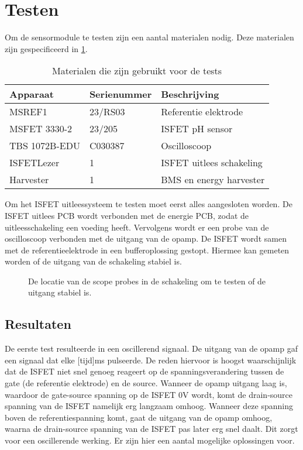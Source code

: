 \section{Testen}
Om de sensormodule te testen zijn een aantal materialen nodig. Deze materialen zijn gespecificeerd in \cref{tab:testMaterialen}.
\begin{table}[ht]
    \centering
    \begin{tabular}{l|l|l}
        Apparaat         & Serienummer & Beschrijving \\
        \hline
        MSREF1           & 23/RS03     & Referentie elektrode       \\
        MSFET 3330-2     & 23/205      & ISFET pH sensor            \\
        TBS 1072B-EDU    & C030387     & Oscilloscoop               \\
        ISFETLezer       & 1           & ISFET uitlees schakeling   \\
        Harvester        & 1           & BMS en energy harvester    \\    
        \hline
    \end{tabular}
    \caption{Materialen die zijn gebruikt voor de tests}
    \label{tab:testMaterialen}
\end{table}

Om het ISFET uitleessysteem te testen moet eerst alles aangesloten worden. De ISFET uitlees PCB wordt verbonden met de energie PCB, zodat de uitleesschakeling een voeding heeft.
Vervolgens wordt er een probe van de oscilloscoop verbonden met de uitgang van de opamp. De ISFET wordt samen met de referentieelektrode in een bufferoplossing gestopt. Hiermee kan gemeten worden of de uitgang van de schakeling stabiel is.

\begin{figure}[ht]
    \centering
    \def\svgwidth{0.5\textwidth}
    
    \caption{De locatie van de scope probes in de schakeling om te testen of de uitgang stabiel is.}
    \label{fig:test ISFET circuit best}
\end{figure}


\subsection{Resultaten}

De eerste test resulteerde in een oscillerend signaal. De uitgang van de opamp gaf een signaal dat elke [tijd]ms pulseerde.
De reden hiervoor is hoogst waarschijnlijk dat de ISFET niet snel genoeg reageert op de spanningsverandering tussen de gate (de referentie elektrode) en de source. Wanneer de opamp uitgang laag is, waardoor de gate-source spanning op de ISFET 0V wordt, komt de drain-source spanning van de ISFET namelijk erg langzaam omhoog. Wanneer deze spanning boven de referentiespanning komt, gaat de uitgang van de opamp omhoog, waarna de drain-source spanning van de ISFET pas later erg snel daalt. Dit zorgt voor een oscillerende werking.
Er zijn hier een aantal mogelijke oplossingen voor.

